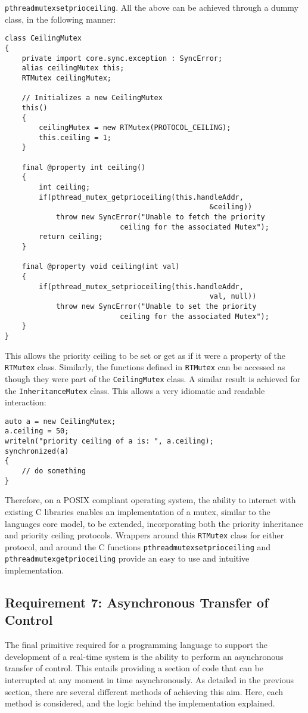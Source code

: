 \texttt{pthread\textunderscore{}mutex\textunderscore{}setprioceiling}.
All the above can be achieved through a dummy class, in the following manner: 
\begin{lstlisting}
class CeilingMutex 
{
    private import core.sync.exception : SyncError;
    alias ceilingMutex this;
    RTMutex ceilingMutex;

    // Initializes a new CeilingMutex
    this()
    {
        ceilingMutex = new RTMutex(PROTOCOL_CEILING);
        this.ceiling = 1;
    }

    final @property int ceiling()
    {
        int ceiling; 
        if(pthread_mutex_getprioceiling(this.handleAddr, 
                                                &ceiling))
            throw new SyncError("Unable to fetch the priority 
                           ceiling for the associated Mutex"); 
        return ceiling; 
    }

    final @property void ceiling(int val)
    {
        if(pthread_mutex_setprioceiling(this.handleAddr, 
                                                val, null))
            throw new SyncError("Unable to set the priority 
                           ceiling for the associated Mutex"); 
    }
}
\end{lstlisting}
This allows the priority ceiling to be set or get as if it were a property of 
the \texttt{RTMutex} class. Similarly, the functions defined in \texttt{RTMutex} 
can be accessed as though they were part of the \texttt{CeilingMutex} class. 
A similar result is achieved for the \texttt{InheritanceMutex} class.
This allows a very idiomatic and readable interaction: 
\begin{lstlisting}
auto a = new CeilingMutex;
a.ceiling = 50; 
writeln("priority ceiling of a is: ", a.ceiling); 
synchronized(a) 
{
    // do something
}
\end{lstlisting}
Therefore, on a POSIX compliant operating system, the ability to interact with 
existing C libraries enables an implementation of a mutex, similar to the languages 
core model, to be extended, incorporating both the priority inheritance and 
priority ceiling protocols. Wrappers around this \texttt{RTMutex} class for 
either protocol, and around the C functions 
\texttt{pthread\textunderscore{}mutex\textunderscore{}setprioceiling} 
and \texttt{pthread\textunderscore{}mutex\textunderscore{}getprioceiling{}} 
provide an easy to use and intuitive implementation. 

\subsection{Requirement 7: Asynchronous Transfer of Control} %
The final primitive required for a programming language to support the development 
of a real-time system is the ability to perform an asynchronous transfer of 
control. This entails providing a section of code that can be interrupted at 
any moment in time asynchronously.
As detailed in the previous section, there are several different methods of 
achieving this aim. Here, each method is considered, and the logic behind the 
implementation explained. 
